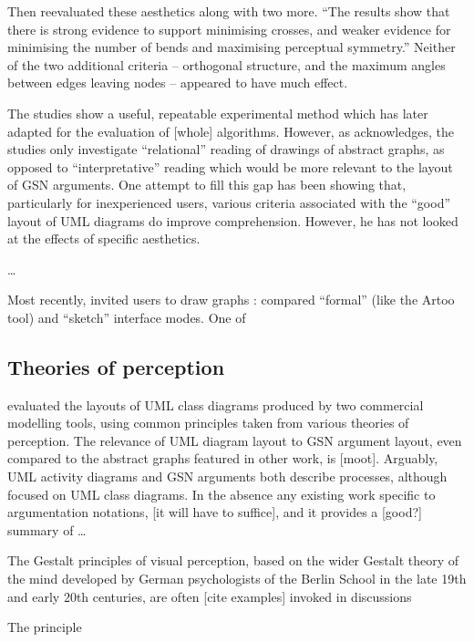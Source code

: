 Then \citet{Purchase1997which} reevaluated these aesthetics along with two more. ``The results show that there is strong
evidence to support minimising crosses, and weaker evidence for minimising the number of bends and maximising perceptual symmetry.''
Neither of the two additional criteria -- orthogonal structure, and the maximum angles between edges leaving nodes -- appeared to have much effect.

The studies show a useful, repeatable experimental method which \citet{PURCHASE1998647} has later adapted for the evaluation of [whole] algorithms.
However, as \citet{Purchase1997which} acknowledges, the studies only investigate ``relational'' reading of drawings of abstract graphs, as opposed to ``interpretative'' reading which would be more relevant to the layout of GSN arguments. One attempt to fill this gap has been \citet{storrle} showing that, particularly for inexperienced users, various criteria associated with the ``good'' layout of UML diagrams do improve comprehension. However, he has not looked at the effects of specific aesthetics.

\citet{huang2007effects}

\ldots

Most recently, \citet{5674033} invited users to draw graphs :
compared ``formal'' (like the Artoo tool) and ``sketch'' interface modes.
One of

\subsection{Theories of perception}

\citet{kennysun} evaluated the layouts of UML class diagrams produced by two commercial modelling tools, using common principles taken from various theories of perception.
The relevance of UML diagram layout to GSN argument layout, even compared to the abstract graphs featured in other work, is [moot].
Arguably, UML activity diagrams and GSN arguments both describe processes, although \citeauthor{kennysun} focused on UML class diagrams.
In the absence any existing work specific to argumentation notations, [it will have to suffice], and it provides a [good?] summary of \ldots


The Gestalt principles of visual perception,
based on the wider Gestalt theory of the mind developed by German psychologists of the Berlin School in the late 19th and early 20th centuries,
are often [cite examples] \citep[136]{storrle} invoked in discussions 

The principle 

